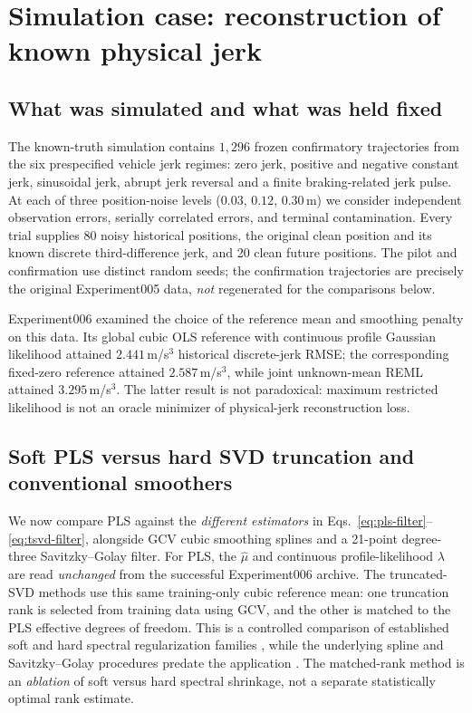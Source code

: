 \section{Simulation case: reconstruction of known physical jerk}
\label{sec:synthetic-case}

\subsection{What was simulated and what was held fixed}
The known-truth simulation contains $1{,}296$ frozen
confirmatory trajectories from the six prespecified
vehicle jerk regimes: zero jerk, positive and negative
constant jerk, sinusoidal jerk, abrupt jerk reversal and
a finite braking-related jerk pulse. At each of three
position-noise levels ($0.03$, $0.12$, $0.30$\,m)
we consider independent observation errors,
serially correlated errors, and terminal
contamination. Every trial supplies 80 noisy historical
positions, the original clean position and its known
discrete third-difference jerk, and 20 clean future
positions. The pilot and confirmation use distinct
random seeds; the confirmation trajectories
are precisely the original Experiment005 data,
\emph{not} regenerated for the comparisons below.

Experiment006 examined the choice of the reference mean
and smoothing penalty on this data. Its global cubic
OLS reference with continuous profile Gaussian
likelihood attained $2.441$\,m/s$^3$ historical
discrete-jerk RMSE; the corresponding fixed-zero
reference attained $2.587$\,m/s$^3$, while joint
unknown-mean REML attained $3.295$\,m/s$^3$.
The latter result is not paradoxical: maximum
restricted likelihood is not an oracle minimizer
of physical-jerk reconstruction loss.

\subsection{Soft PLS versus hard SVD truncation and conventional smoothers}
We now compare PLS against the \emph{different estimators}
in Eqs.~\eqref{eq:pls-filter}--\eqref{eq:tsvd-filter},
alongside GCV cubic smoothing splines and a
21-point degree-three Savitzky--Golay filter.
For PLS, the $\widehat\mu$ and continuous
profile-likelihood $\lambda$ are read \emph{unchanged}
from the successful Experiment006 archive.
The truncated-SVD methods use this same
training-only cubic reference mean:
one truncation rank is selected from training data
using GCV, and the other is matched to the PLS
effective degrees of freedom. This is a controlled comparison
of established soft and hard spectral regularization families
\citep{hansen1990tsvd}, while the underlying spline and
Savitzky--Golay procedures predate the application
\citep{reinsch1967,savitzky1964}. The matched-rank
method is an \emph{ablation} of soft versus hard
spectral shrinkage, not a separate statistically
optimal rank estimate.

